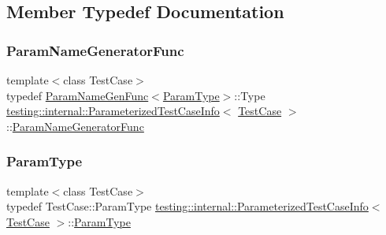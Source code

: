 \subsection{Member Typedef Documentation}
\mbox{\label{classtesting_1_1internal_1_1ParameterizedTestCaseInfo_aed6c5184cb8f94cec73e9d7c4b7fa2ce}} 
\subsubsection{\texorpdfstring{ParamNameGeneratorFunc}{ParamNameGeneratorFunc}}
{\footnotesize\ttfamily template$<$class Test\+Case$>$ \\
typedef \mbox{\hyperlink{structtesting_1_1internal_1_1ParamNameGenFunc}{Param\+Name\+Gen\+Func}}$<$\mbox{\hyperlink{classtesting_1_1internal_1_1ParameterizedTestCaseInfo_a643a87e178bf92a4246ce21054e44b96}{Param\+Type}}$>$\+::Type \mbox{\hyperlink{classtesting_1_1internal_1_1ParameterizedTestCaseInfo}{testing\+::internal\+::\+Parameterized\+Test\+Case\+Info}}$<$ \mbox{\hyperlink{classtesting_1_1TestCase}{Test\+Case}} $>$\+::\mbox{\hyperlink{classtesting_1_1internal_1_1ParameterizedTestCaseInfo_aed6c5184cb8f94cec73e9d7c4b7fa2ce}{Param\+Name\+Generator\+Func}}}

\mbox{\label{classtesting_1_1internal_1_1ParameterizedTestCaseInfo_a643a87e178bf92a4246ce21054e44b96}} 
\subsubsection{\texorpdfstring{ParamType}{ParamType}}
{\footnotesize\ttfamily template$<$class Test\+Case$>$ \\
typedef Test\+Case\+::\+Param\+Type \mbox{\hyperlink{classtesting_1_1internal_1_1ParameterizedTestCaseInfo}{testing\+::internal\+::\+Parameterized\+Test\+Case\+Info}}$<$ \mbox{\hyperlink{classtesting_1_1TestCase}{Test\+Case}} $>$\+::\mbox{\hyperlink{classtesting_1_1internal_1_1ParameterizedTestCaseInfo_a643a87e178bf92a4246ce21054e44b96}{Param\+Type}}}



